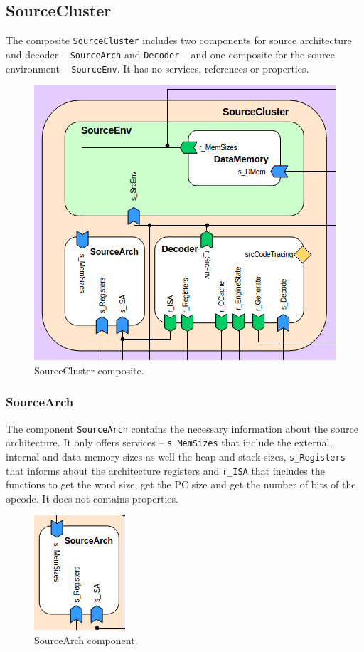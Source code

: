 \documentclass{report}
\begin{document}
		\subsection{SourceCluster}
		
		\par The composite \texttt{SourceCluster} includes two components for source architecture and decoder -- \texttt{SourceArch} and \texttt{Decoder} -- and one composite for the source environment -- \texttt{SourceEnv}. It has no services, references or properties.
		
		\begin{figure} [H]
			\centering
			\includegraphics[width=0.6\linewidth]{Images/arch-ref/SourceCluster}
			\caption{SourceCluster composite.}
			\label{fig:SourceCluster}
		\end{figure}
		
			\subsubsection{SourceArch}
			
			The component \texttt{SourceArch} contains the necessary information about the source architecture. It only offers services -- \texttt{s\_MemSizes} that include the external, internal and data memory sizes as well the heap and stack sizes, \texttt{s\_Registers} that informs about the architecture registers and \texttt{r\_ISA} that includes the functions to get the word size, get the PC size and get the number of bits of the opcode. It does not contains properties.
			
			\begin{figure} [H]
				\centering
				\includegraphics[width=0.25\linewidth]{Images/arch-ref/SourceArch}
				\caption{SourceArch component.}
				\label{fig:SourceArch}
			\end{figure}
		
\end{document}
